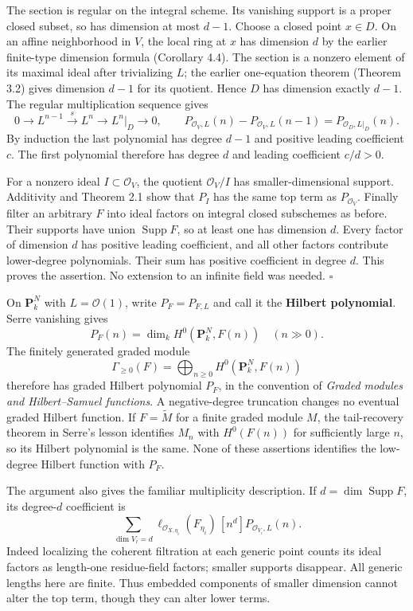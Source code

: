 \documentclass[11pt]{article}
\begin{document}
The section is regular on the integral scheme. Its vanishing support is
a proper closed subset, so has dimension at most \(d-1\). Choose a
closed point \(x\in D\). On an affine neighborhood in \(V\), the local
ring at \(x\) has dimension \(d\) by the earlier finite-type dimension
formula (Corollary 4.4). The section is a nonzero element of its maximal
ideal after trivializing \(L\); the earlier one-equation theorem
(Theorem 3.2) gives dimension \(d-1\) for its quotient. Hence \(D\) has
dimension exactly \(d-1\). The regular multiplication sequence gives \[
0\to L^{n-1}\xrightarrow{s}L^n\to L^n|_D\to0,
\qquad P_{\mathcal O_V,L}(n)-P_{\mathcal O_V,L}(n-1)=P_{\mathcal O_D,L|_D}(n).
\] By induction the last polynomial has degree \(d-1\) and positive
leading coefficient \(c\). The first polynomial therefore has degree
\(d\) and leading coefficient \(c/d>0\).

For a nonzero ideal \(I\subset\mathcal O_V\), the quotient
\(\mathcal O_V/I\) has smaller-dimensional support. Additivity and
Theorem 2.1 show that \(P_I\) has the same top term as
\(P_{\mathcal O_V}\). Finally filter an arbitrary \(F\) into ideal
factors on integral closed subschemes as before. Their supports have
union \(\operatorname{Supp}F\), so at least one has dimension \(d\).
Every factor of dimension \(d\) has positive leading coefficient, and
all other factors contribute lower-degree polynomials. Their sum has
positive coefficient in degree \(d\). This proves the assertion. No
extension to an infinite field was needed. \(\square\)

On \(\mathbf P^N_k\) with \(L=\mathcal O(1)\), write \(P_F=P_{F,L}\) and
call it the \textbf{Hilbert polynomial}. Serre vanishing gives \[
P_F(n)=\dim_k H^0(\mathbf P^N_k,F(n))\quad(n\gg0).
\] The finitely generated graded module \[
\Gamma_{\geq0}(F)=\bigoplus_{n\geq0}H^0(\mathbf P^N_k,F(n))
\] therefore has graded Hilbert polynomial \(P_F\), in the convention of
\emph{Graded modules and Hilbert--Samuel functions}. A negative-degree
truncation changes no eventual graded Hilbert function. If
\(F=\widetilde M\) for a finite graded module \(M\), the tail-recovery
theorem in Serre's lesson identifies \(M_n\) with \(H^0(F(n))\) for
sufficiently large \(n\), so its Hilbert polynomial is the same. None of
these assertions identifies the low-degree Hilbert function with
\(P_F\).

The argument also gives the familiar multiplicity description. If
\(d=\dim\operatorname{Supp}F\), its degree-\(d\) coefficient is \[
\sum_{\dim V_i=d}\ell_{\mathcal O_{X,\eta_i}}(F_{\eta_i})\,
[n^d]P_{\mathcal O_{V_i},L}(n).
\] Indeed localizing the coherent filtration at each generic point
counts its ideal factors as length-one residue-field factors; smaller
supports disappear. All generic lengths here are finite. Thus embedded
components of smaller dimension cannot alter the top term, though they
can alter lower terms.
\end{document}
